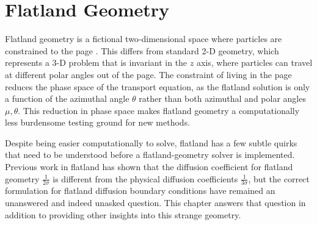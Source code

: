 
\chapter{Flatland Geometry}\label{chap:flatland}

Flatland geometry is a fictional two-dimensional space where particles are
constrained to the page \cite{Abb1884,Asa2008}. This differs from standard 2-D
geometry, which represents a 3-D problem that is invariant in the $z$ axis,
where particles can travel at different polar angles out of the page. The
constraint of living in the page reduces the phase space of the transport
equation, as the flatland solution is only a function of the azimuthal angle
$\theta$
rather than both azimuthal and polar angles $\mu,\theta$. This reduction in
phase space makes 
flatland geometry a computationally less burdensome testing ground for new
methods.

Despite being easier computationally to solve, flatland has a few subtle quirks
that need to be understood before a flatland-geometry solver is implemented.
Previous work in flatland \cite{Asa2008,Lar2009c} has shown that the
diffusion coefficient for flatland geometry $\frac{1}{2\sigma}$ is different from
the physical diffusion coefficients $\frac{1}{3\sigma}$, but the correct
formulation for flatland diffusion boundary
conditions have remained an unanswered and indeed unasked question. This
chapter answers that question in addition to providing other insights into this
strange geometry.

